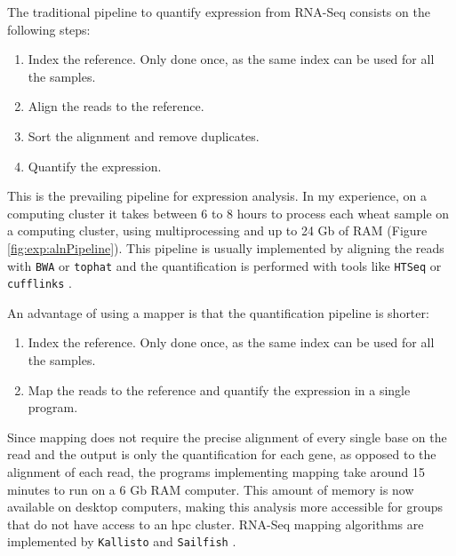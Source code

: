 The traditional pipeline to quantify expression from RNA-Seq consists on the following steps:
\begin{enumerate}
  \item Index the reference. Only done once, as the same index can be used for all the samples. 
  \item Align the reads to the reference. 
  \item Sort the alignment and remove duplicates. 
  \item Quantify the expression.  
\end{enumerate}
This is the prevailing pipeline for expression analysis. 
In my experience, on a computing cluster it takes between 6 to 8 hours to process each wheat sample on a computing cluster, using multiprocessing and up to 24 Gb of RAM (Figure \ref{fig:exp:alnPipeline}). 
This pipeline is usually implemented by aligning the reads with \verb|BWA| \citep{Li2009} or \verb|tophat|  \citep{Trapnell2012} and the quantification is performed with tools like \verb|HTSeq| \citep{Anders2015} or \verb|cufflinks| \citep{Trapnell2012}.

An advantage of using a mapper is that the quantification pipeline is shorter:
\begin{enumerate}
  \item Index the reference. Only done once, as the same index can be used for all the samples. 
  \item Map the reads to the reference and quantify the expression in a single program.   
\end{enumerate}
Since mapping does not require the precise alignment of every single base on the read and the output is only the quantification for each gene, as opposed to the alignment of each read, the programs implementing mapping take around 15 minutes to run on a 6 Gb RAM computer.
This amount of memory is now available on desktop computers, making this analysis more accessible for groups that do not have access to an \gls{hpc} cluster.
RNA-Seq mapping algorithms are implemented by \verb|Kallisto|  \citep{Bray2016} and \verb|Sailfish| \citep{Patro2014}.

